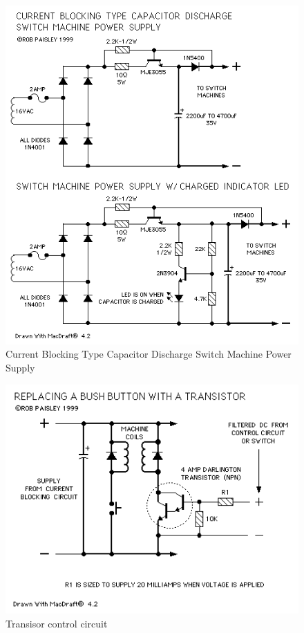 \begin{figure}[hbpt]
\begin{centering}
\includegraphics[width=5in]{CDblock.png}
\caption{Current Blocking Type Capacitor Discharge Switch Machine Power Supply}
\label{fig:Turnouts:CDblock}
\end{centering}
\end{figure}
\begin{figure}[hbpt]
\begin{centering}
\includegraphics[width=5in]{CDtransistor.png}
\caption{Transisor control circuit}
\label{fig:Turnouts:CDtransistor}
\end{centering}
\end{figure}
